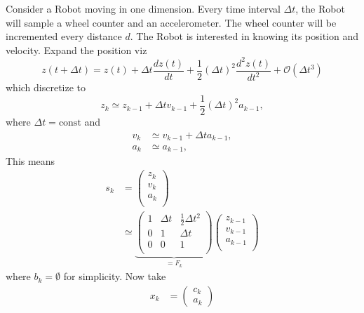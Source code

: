 \begin{example}
	Consider a Robot moving in one dimension. Every time interval $\Delta t$, the Robot will sample a wheel counter and an accelerometer. The wheel counter will be incremented every distance $d$. The Robot is interested in knowing its position and velocity. Expand the position viz
	\begin{equation}
		z(t+\Delta t)=z(t)+\Delta t \frac{dz(t)}{dt}+\frac{1}{2}(\Delta t)^2\frac{d^2z(t)}{dt^2}+\mathcal{O}(\Delta t^3)
	\end{equation}
	which discretize to
	\begin{equation}
		z_k\simeq z_{k-1}+\Delta t v_{k-1}+\frac{1}{2}(\Delta t)^2a_{k-1},
	\end{equation}
	where $\Delta t = \text{const}$ and
	\begin{equation}
		\begin{split}
			v_k &\simeq v_{k-1}+\Delta t a_{k-1},\\
			a_k &\simeq a_{k-1},
		\end{split}
	\end{equation}
	This means
	\begin{equation}
		\begin{split}
			s_k &= \begin{pmatrix}
				z_k\\ v_{k} \\ a_k\\
			\end{pmatrix}\\
			& \simeq \underbrace{\begin{pmatrix}
					1 & \Delta t & \frac{1}{2}\Delta t^2  \\
					0 & 1 & \Delta t  \\
					0 & 0 & 1  \\
			\end{pmatrix}}_{=F_k}\begin{pmatrix}
				z_{k-1}\\ v_{k-1} \\ a_{k-1}\\
			\end{pmatrix}
		\end{split}
	\end{equation}
	where $b_k=\emptyset$ for simplicity. Now take
	\begin{equation}
		\begin{split}
			x_k &= \begin{pmatrix}
				c_k \\ a_k
			\end{pmatrix}\\

\end{split}
\end{equation}
\end{example}
